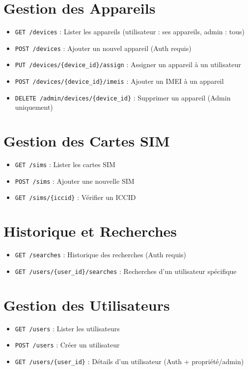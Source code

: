 \documentclass{article}
\begin{document}
\section{Gestion des Appareils}
\begin{itemize}
    \item \texttt{GET /devices} : Lister les appareils (utilisateur : ses appareils, admin : tous)
    \item \texttt{POST /devices} : Ajouter un nouvel appareil (Auth requis)
    \item \texttt{PUT /devices/\{device\_id\}/assign} : Assigner un appareil à un utilisateur
    \item \texttt{POST /devices/\{device\_id\}/imeis} : Ajouter un IMEI à un appareil
    \item \texttt{DELETE /admin/devices/\{device\_id\}} : Supprimer un appareil (Admin uniquement)
\end{itemize}

\section{Gestion des Cartes SIM}
\begin{itemize}
    \item \texttt{GET /sims} : Lister les cartes SIM
    \item \texttt{POST /sims} : Ajouter une nouvelle SIM
    \item \texttt{GET /sims/\{iccid\}} : Vérifier un ICCID
\end{itemize}

\section{Historique et Recherches}
\begin{itemize}
    \item \texttt{GET /searches} : Historique des recherches (Auth requis)
    \item \texttt{GET /users/\{user\_id\}/searches} : Recherches d'un utilisateur spécifique
\end{itemize}

\section{Gestion des Utilisateurs}
\begin{itemize}
    \item \texttt{GET /users} : Lister les utilisateurs
    \item \texttt{POST /users} : Créer un utilisateur
    \item \texttt{GET /users/\{user\_id\}} : Détails d'un utilisateur (Auth + propriété/admin)
\end{itemize}
\end{document}
